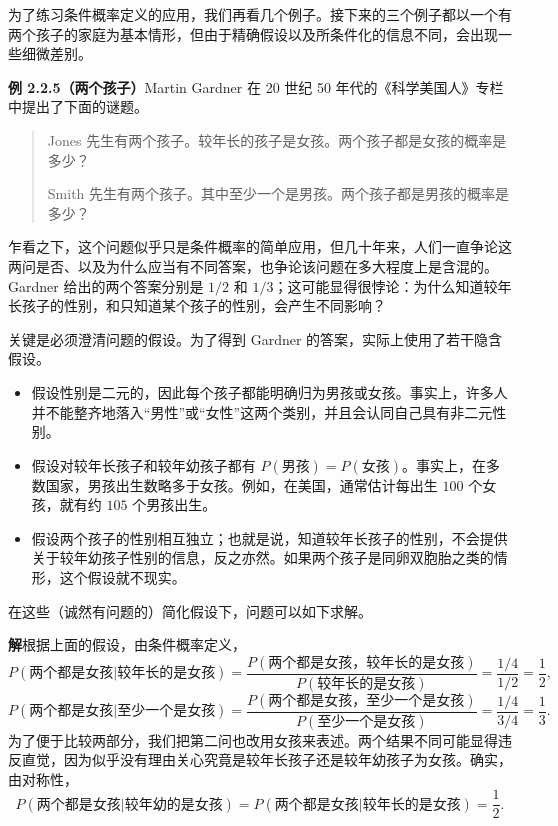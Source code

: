 \documentclass[UTF8,12pt,a4paper,fontset=fandol]{ctexart}
\begin{document}
为了练习条件概率定义的应用，我们再看几个例子。接下来的三个例子都以一个有两个孩子的家庭为基本情形，但由于精确假设以及所条件化的信息不同，会出现一些细微差别。

\noindent\textbf{例 2.2.5（两个孩子）}\quad Martin Gardner 在 20 世纪 50 年代的《科学美国人》专栏中提出了下面的谜题。

\begin{quote}
Jones 先生有两个孩子。较年长的孩子是女孩。两个孩子都是女孩的概率是多少？

Smith 先生有两个孩子。其中至少一个是男孩。两个孩子都是男孩的概率是多少？
\end{quote}

乍看之下，这个问题似乎只是条件概率的简单应用，但几十年来，人们一直争论这两问是否、以及为什么应当有不同答案，也争论该问题在多大程度上是含混的。Gardner 给出的两个答案分别是 $1/2$ 和 $1/3$；这可能显得很悖论：为什么知道较年长孩子的性别，和只知道某个孩子的性别，会产生不同影响？

关键是必须澄清问题的假设。为了得到 Gardner 的答案，实际上使用了若干隐含假设。

\begin{itemize}
  \item 假设性别是二元的，因此每个孩子都能明确归为男孩或女孩。事实上，许多人并不能整齐地落入“男性”或“女性”这两个类别，并且会认同自己具有非二元性别。
  \item 假设对较年长孩子和较年幼孩子都有 $P(\text{男孩})=P(\text{女孩})$。事实上，在多数国家，男孩出生数略多于女孩。例如，在美国，通常估计每出生 $100$ 个女孩，就有约 $105$ 个男孩出生。
  \item 假设两个孩子的性别相互独立；也就是说，知道较年长孩子的性别，不会提供关于较年幼孩子性别的信息，反之亦然。如果两个孩子是同卵双胞胎之类的情形，这个假设就不现实。
\end{itemize}

在这些（诚然有问题的）简化假设下，问题可以如下求解。

\noindent\textbf{解}\quad 根据上面的假设，由条件概率定义，
\[
  P(\text{两个都是女孩}|\text{较年长的是女孩})
  =
  \frac{P(\text{两个都是女孩，较年长的是女孩})}
       {P(\text{较年长的是女孩})}
  =\frac{1/4}{1/2}=\frac12,
\]
\[
  P(\text{两个都是女孩}|\text{至少一个是女孩})
  =
  \frac{P(\text{两个都是女孩，至少一个是女孩})}
       {P(\text{至少一个是女孩})}
  =\frac{1/4}{3/4}=\frac13.
\]
为了便于比较两部分，我们把第二问也改用女孩来表述。两个结果不同可能显得违反直觉，因为似乎没有理由关心究竟是较年长孩子还是较年幼孩子为女孩。确实，由对称性，
\[
  P(\text{两个都是女孩}|\text{较年幼的是女孩})
  =
  P(\text{两个都是女孩}|\text{较年长的是女孩})
  =\frac12.
\]
\end{document}
